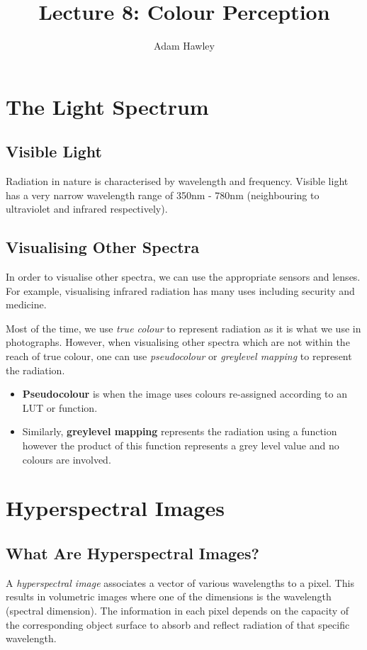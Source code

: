 \documentclass{article}
\author{Adam Hawley}
\title{Lecture 8: Colour Perception}
\begin{document}
\maketitle
\tableofcontents
\newpage

\section{The Light Spectrum}
\subsection{Visible Light}
Radiation in nature is characterised by wavelength and frequency.
Visible light has a very narrow wavelength range of 350nm - 780nm (neighbouring to ultraviolet and infrared respectively).

\subsection{Visualising Other Spectra}
In order to visualise other spectra, we can use the appropriate sensors and lenses.
For example, visualising infrared radiation has many uses including security and medicine.

Most of the time, we use {\it true colour} to represent radiation as it is what we use in photographs.
However, when visualising other spectra which are not within the reach of true colour, one can use {\it pseudocolour} or {\it greylevel mapping} to represent the radiation.
\begin{itemize}
	\item {\bf Pseudocolour} is when the image uses colours re-assigned according to an LUT or function.
	\item Similarly, {\bf greylevel mapping} represents the radiation using a function however the product of this function represents a grey level value and no colours are involved.
\end{itemize}

\section{Hyperspectral Images}
\subsection{What Are Hyperspectral Images?}
A {\it hyperspectral image} associates a vector of various wavelengths to a pixel.
This results in volumetric images where one of the dimensions is the wavelength (spectral dimension).
The information in each pixel depends on the capacity of the corresponding object surface to absorb and reflect radiation of that specific wavelength.
\end{document}

